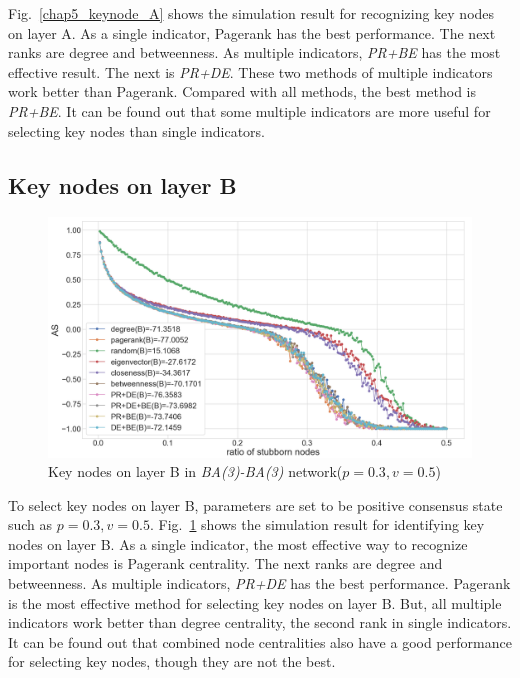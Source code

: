 Fig.~\ref{chap5_keynode_A} shows the simulation result for recognizing key nodes on layer A. As a single indicator, Pagerank has the best performance. The next ranks are degree and betweenness. As multiple indicators, \textit{PR+BE} has the most effective result. The next is \textit{PR+DE}. These two methods of multiple indicators work better than Pagerank. Compared with all methods, the best method is \textit{PR+BE}. It can be found out that some multiple indicators are more useful for selecting key nodes than single indicators. \\

\subsection{Key nodes on layer B}
\label{layerB}
\begin{figure}[!htb]
	\centering
	\includegraphics[width=\hsize]{figure/chap5_keynode_B.png}
	\caption{Key nodes on layer B in \textit{BA(3)-BA(3)} network($p=0.3, v=0.5$)}
	\label{chap5_keynode_B}
\end{figure}

To select key nodes on layer B, parameters are set to be positive consensus state such as $p=0.3, v=0.5$. Fig.~\ref{chap5_keynode_B} shows the simulation result for identifying key nodes on layer B. As a single indicator, the most effective way to recognize important nodes is Pagerank centrality. The next ranks are degree and betweenness. As multiple indicators, \textit{PR+DE} has the best performance. Pagerank is the most effective method for selecting key nodes on layer B. But, all multiple indicators work better than degree centrality, the second rank in single indicators. It can be found out that combined node centralities also have a good performance for selecting key nodes, though they are not the best. \\

